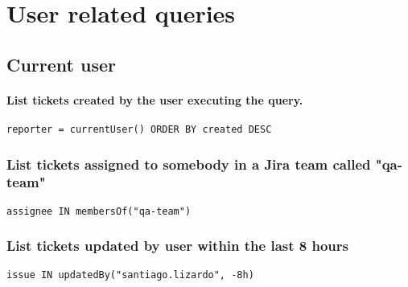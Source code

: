 \newpage
\chapter{User related queries}

\section{Current user}

\subsubsection*{List tickets created by the user executing the query.}

\begin{small}
    \begin{lstlisting}[language=jql]
reporter = currentUser() ORDER BY created DESC
\end{lstlisting}
\end{small}

\subsection*{List tickets assigned to somebody in a Jira team called "qa-team"}

\begin{small}
    \begin{lstlisting}[language=jql]
assignee IN membersOf("qa-team")
\end{lstlisting}
\end{small}

\subsection*{List tickets updated by user within the last 8 hours}

\begin{small}
    \begin{lstlisting}[language=jql]
issue IN updatedBy("santiago.lizardo", -8h)
\end{lstlisting}
\end{small}

